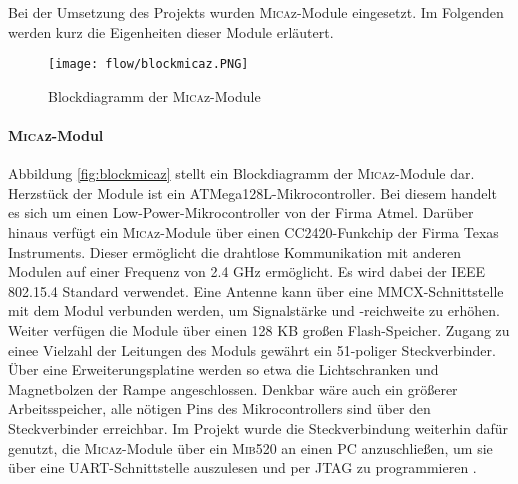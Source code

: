 Bei der Umsetzung des Projekts wurden \textsc{Mica}z-Module eingesetzt. Im Folgenden werden kurz die Eigenheiten dieser Module erläutert.

\begin{figure}[th]
  \centering
    \texttt{[image: flow/blockmicaz.PNG]}
    \caption{Blockdiagramm der \textsc{Mica}z-Module}
    \label{fig:blockmicaz}
\end{figure}

\paragraph{\textsc{Mica}z-Modul}
Abbildung \autoref{fig:blockmicaz} stellt ein Blockdiagramm der \textsc{Mica}z-Module dar. Herzstück der Module ist ein ATMega128L-Mikrocontroller. Bei diesem handelt es sich um einen Low-Power-Mikrocontroller von der Firma Atmel. Darüber hinaus verfügt ein \textsc{Mica}z-Module über einen CC2420-Funkchip der Firma Texas Instruments. Dieser ermöglicht die drahtlose Kommunikation mit anderen Modulen auf einer Frequenz von 2.4 GHz ermöglicht. Es wird dabei der IEEE 802.15.4 Standard verwendet. Eine Antenne kann über eine MMCX-Schnittstelle mit dem Modul verbunden werden, um Signalstärke und -reichweite zu erhöhen. Weiter verfügen die Module über einen 128 KB großen Flash-Speicher.
Zugang zu einee Vielzahl der Leitungen des Moduls gewährt ein 51-poliger Steckverbinder. Über eine Erweiterungsplatine werden so etwa die Lichtschranken und Magnetbolzen der Rampe angeschlossen. Denkbar wäre auch ein größerer Arbeitsspeicher, alle nötigen Pins des Mikrocontrollers sind über den Steckverbinder erreichbar.
Im Projekt wurde die Steckverbindung weiterhin dafür genutzt, die \textsc{Mica}z-Module über ein \textsc{Mib}520 an einen PC anzuschließen, um sie über eine UART-Schnittstelle auszulesen und per JTAG zu programmieren \cite{MICSHEET,C2420SHEET}.

